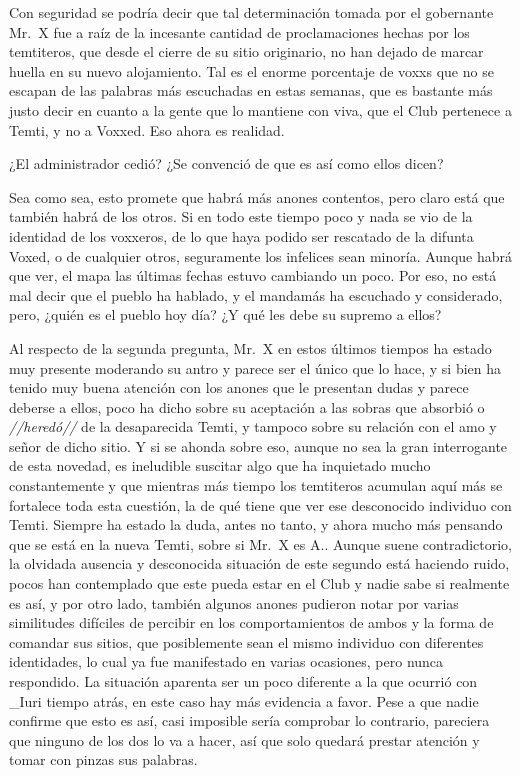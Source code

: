 \documentclass[
  spanish,
]{book}
\begin{document}
Con seguridad se podría decir que tal determinación tomada por el gobernante Mr.~X fue a raíz de la incesante cantidad de proclamaciones hechas por los temtiteros, que desde el cierre de su sitio originario, no han dejado de marcar huella en su nuevo alojamiento.
Tal es el enorme porcentaje de voxxs que no se escapan de las palabras más escuchadas en estas semanas, que es bastante más justo decir en cuanto a la gente que lo mantiene con viva, que el Club pertenece a Temti, y no a Voxxed. Eso ahora es realidad.

¿El administrador cedió? ¿Se convenció de que es así como ellos dicen?

Sea como sea, esto promete que habrá más anones contentos, pero claro está que también habrá de los otros. Si en todo este tiempo poco y nada se vio de la identidad de los voxxeros, de lo que haya podido ser rescatado de la difunta Voxed, o de cualquier otros, seguramente los infelices sean minoría. Aunque habrá que ver, el mapa las últimas fechas estuvo cambiando un poco. Por eso, no está mal decir que el pueblo ha hablado, y el mandamás ha escuchado y considerado, pero, ¿quién es el pueblo hoy día? ¿Y qué les debe su supremo a ellos?

Al respecto de la segunda pregunta, Mr.~X en estos últimos tiempos ha estado muy presente moderando su antro y parece ser el único que lo hace, y si bien ha tenido muy buena atención con los anones que le presentan dudas y parece deberse a ellos, poco ha dicho sobre su aceptación a las sobras que absorbió o \emph{//heredó//} de la desaparecida Temti, y tampoco sobre su relación con el amo y señor de dicho sitio. Y si se ahonda sobre eso, aunque no sea la gran interrogante de esta novedad, es ineludible suscitar algo que ha inquietado mucho constantemente y que mientras más tiempo los temtiteros acumulan aquí más se fortalece toda esta cuestión, la de qué tiene que ver ese desconocido individuo con Temti.
Siempre ha estado la duda, antes no tanto, y ahora mucho más pensando que se está en la nueva Temti, sobre si Mr.~X es A.. Aunque suene contradictorio, la olvidada ausencia y desconocida situación de este segundo está haciendo ruido, pocos han contemplado que este pueda estar en el Club y nadie sabe si realmente es así, y por otro lado, también algunos anones pudieron notar por varias similitudes difíciles de percibir en los comportamientos de ambos y la forma de comandar sus sitios, que posiblemente sean el mismo individuo con diferentes identidades, lo cual ya fue manifestado en varias ocasiones, pero nunca respondido.
La situación aparenta ser un poco diferente a la que ocurrió con \_Iuri tiempo atrás, en este caso hay más evidencia a favor. Pese a que nadie confirme que esto es así, casi imposible sería comprobar lo contrario, pareciera que ninguno de los dos lo va a hacer, así que solo quedará prestar atención y tomar con pinzas sus palabras.
\end{document}
